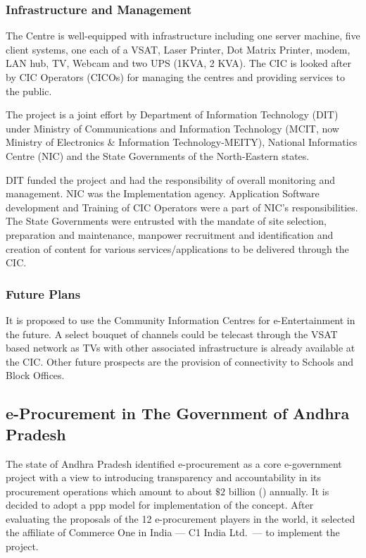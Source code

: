 \subsubsection*{Infrastructure and Management}
The Centre is well-equipped with infrastructure including one server machine, five client systems, one each of a VSAT, Laser Printer, Dot Matrix Printer, modem, LAN hub, TV, Webcam and two UPS (1KVA, 2 KVA). The CIC is looked after by CIC Operators (CICOs) for managing the centres and providing services to the public.

The project is a joint effort by Department of Information Technology (DIT) under Ministry of Communications and Information Technology (MCIT, now Ministry of Electronics \& Information Technology-MEITY), National Informatics Centre (NIC) and the State Governments of the North-Eastern states.

DIT  funded the project and had the responsibility of overall monitoring and management. NIC was the Implementation agency. Application Software development and Training of CIC Operators were a part of NIC’s responsibilities. The State Governments were entrusted with the mandate of site selection, preparation and maintenance, manpower recruitment and identification and creation of content for various services/applications to be delivered through the CIC.

\subsubsection*{Future Plans}
It is proposed to use the Community Information Centres for e-Entertainment in the future. A select bouquet of channels could be telecast through the VSAT based network as TVs with other associated infrastructure is already available at the CIC. Other future prospects are the provision of connectivity to Schools and Block Offices.

\subsection{e-Procurement in The Government of Andhra Pradesh}
The state of Andhra Pradesh identified e-procurement as a core e-government project with a view to introducing transparency and accountability in its procurement operations which amount to about \(\$ 2\) billion () annually. It is decided to adopt a \gls{ppp} model for implementation of the concept. After evaluating the proposals of the 12 e-procurement players in the world, it selected the affiliate of Commerce One in India — C1 India Ltd.\ — to implement the project.

